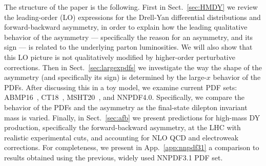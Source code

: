 The structure of the paper is the following.
%
First  in Sect.~\ref{sec:HMDY} we review the leading-order (LO) expressions
for the Drell-Yan differential distributions and forward-backward asymmetry, in order to 
explain  how the leading qualitative behavior of the
asymmetry  --- specifically the reason for an asymmetry, and
its sign --- is related to the underlying parton luminosities. We 
will also show that this LO picture is not qualitatively modified 
by higher-order perturbative corrections. 
%
Then in Sect.~\ref{sec:largexpdfs} we investigate the way the
shape of the asymmetry (and specifically its sign) is determined
by the large-$x$ behavior of the PDFs. After discussing this in a 
toy model, we examine current PDF sets:
ABMP16~\cite{Alekhin:2017kpj},
CT18~\cite{Hou:2019efy}, MSHT20~\cite{Bailey:2020ooq}, and
NNPDF4.0.
%
Specifically, we  compare the
behavior of the PDFs and the asymmetry as the
final-state dilepton invariant mass is varied.
%
Finally, in Sect.~\ref{sec:afb} we present predictions 
for high-mass DY production, specifically 
the forward-backward asymmetry, at the LHC with realistic experimental
cuts, and accounting for NLO QCD and electroweak corrections.
%
For completeness, we present in App.~\ref{app:nnpdf31} a comparison to results
obtained using the previous, widely used  NNPDF3.1 PDF set.




